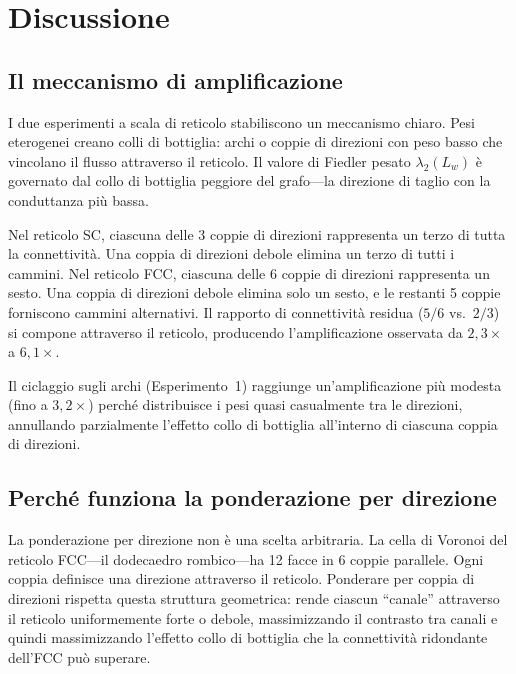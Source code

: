 \documentclass[11pt]{article}
\begin{document}
\section{Discussione}
\label{sec:discussion}

\subsection{Il meccanismo di amplificazione}

I due esperimenti a scala di reticolo stabiliscono un meccanismo
chiaro. Pesi eterogenei creano colli di bottiglia: archi o coppie di
direzioni con peso basso che vincolano il flusso attraverso il
reticolo. Il valore di Fiedler pesato $\lambda_2(L_w)$ \`e governato
dal collo di bottiglia peggiore del grafo---la direzione di taglio con
la conduttanza pi\`u bassa.

Nel reticolo SC, ciascuna delle 3 coppie di direzioni rappresenta un
terzo di tutta la connettivit\`a. Una coppia di direzioni debole
elimina un terzo di tutti i cammini. Nel reticolo FCC, ciascuna delle
6 coppie di direzioni rappresenta un sesto. Una coppia di direzioni
debole elimina solo un sesto, e le restanti 5 coppie forniscono
cammini alternativi. Il rapporto di connettivit\`a residua ($5/6$
vs.\ $2/3$) si compone attraverso il reticolo, producendo
l'amplificazione osservata da $2{,}3\times$ a $6{,}1\times$.

Il ciclaggio sugli archi (Esperimento~1) raggiunge un'amplificazione
pi\`u modesta (fino a $3{,}2\times$) perch\'e distribuisce i pesi
quasi casualmente tra le direzioni, annullando parzialmente l'effetto
collo di bottiglia all'interno di ciascuna coppia di direzioni.

\subsection{Perch\'e funziona la ponderazione per direzione}

La ponderazione per direzione non \`e una scelta arbitraria. La cella
di Voronoi del reticolo FCC---il dodecaedro rombico---ha 12 facce in
6 coppie parallele. Ogni coppia definisce una direzione attraverso il
reticolo. Ponderare per coppia di direzioni rispetta questa struttura
geometrica: rende ciascun ``canale'' attraverso il reticolo
uniformemente forte o debole, massimizzando il contrasto tra canali
e quindi massimizzando l'effetto collo di bottiglia che la
connettivit\`a ridondante dell'FCC pu\`o superare.
\end{document}
